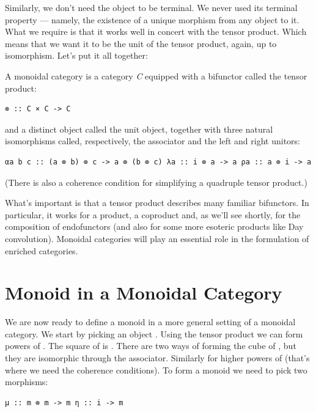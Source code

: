 Similarly, we don't need the object  to be terminal. We never
used its terminal property --- namely, the existence of a unique
morphism from any object to it. What we require is that it works well in
concert with the tensor product. Which means that we want it to be the
unit of the tensor product, again, up to isomorphism. Let's put it all
together:

A monoidal category is a category \emph{C} equipped with a bifunctor
called the tensor product:

\begin{verbatim}
⊗ :: C × C -> C
\end{verbatim}

and a distinct object  called the unit object, together with
three natural isomorphisms called, respectively, the associator and the
left and right unitors:

\begin{verbatim}
αa b c :: (a ⊗ b) ⊗ c -> a ⊗ (b ⊗ c) λa :: i ⊗ a -> a ρa :: a ⊗ i -> a
\end{verbatim}

(There is also a coherence condition for simplifying a quadruple tensor
product.)

What's important is that a tensor product describes many familiar
bifunctors. In particular, it works for a product, a coproduct and, as
we'll see shortly, for the composition of endofunctors (and also for
some more esoteric products like Day convolution). Monoidal categories
will play an essential role in the formulation of enriched categories.

\section{Monoid in a Monoidal
Category}\label{monoid-in-a-monoidal-category}

We are now ready to define a monoid in a more general setting of a
monoidal category. We start by picking an object . Using the
tensor product we can form powers of . The square of
 is . There are two ways of forming the cube
of , but they are isomorphic through the associator. Similarly
for higher powers of  (that's where we need the coherence
conditions). To form a monoid we need to pick two morphisms:

\begin{verbatim}
μ :: m ⊗ m -> m η :: i -> m
\end{verbatim}


